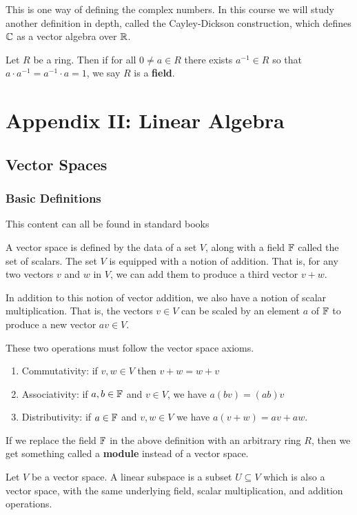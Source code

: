 \begin{remark*}
    This is one way of defining the complex numbers. In this course we will study another definition in depth, called the Cayley-Dickson construction, which defines $\operatorname{\mathbb{C}}$ as a vector algebra over $\operatorname{\mathbb{R}}$.
\end{remark*}
\begin{defn}
    Let $R$ be a ring. Then if for all $0\neq a \in R$ there exists $a^{-1} \in R$ so that $a\cdot a^{-1} = a^{-1} \cdot a=1$, we say $R$ is a \textbf{field}.
\end{defn}

\section{Appendix II: Linear Algebra}
\subsection{Vector Spaces}
\subsubsection{Basic Definitions}
This content can all be found in standard books \cite{Axler2015-in,Roman2008-rh}
\begin{defn}
A vector space is defined by the data of a set $V$, along with a field $\operatorname{\mathbb{F}}$ called the set of scalars. The set $V$ is equipped with a notion of addition. That is, for any two vectors $v$ and $w$ in $V$, we can add them to produce a third vector $v+w$.

In addition to this notion of vector addition, we also have a notion of scalar multiplication. That is, the vectors $v \in V$ can be scaled by an element $a$ of $\operatorname{\mathbb{F}}$ to produce a new vector $av \in V$. 

These two operations must follow the vector space axioms.
\begin{enumerate}
\item {
Commutativity: if $v,w \in V$ then $v + w = w+v$
}
\item {
Associativity: if $a,b \in \operatorname{\mathbb{F}}$ and $v \in V$, we have $a(bv) = (ab)v$
}
\item {
Distributivity: if $a \in \operatorname{\mathbb{F}}$ and $v,w \in V$ we have $a(v+w)=av+aw$.
}
\end{enumerate}
\end{defn}
\begin{remark*}
    If we replace the field $\operatorname{\mathbb{F}}$ in the above definition with an arbitrary ring $R$, then we get something called a \textbf{module} instead of a vector space.
\end{remark*}
\begin{defn} Let $V$ be a vector space. A linear subspace is a subset $U \subseteq V$ which is also a vector space, with the same underlying field, scalar multiplication, and addition operations.
\end{defn}

